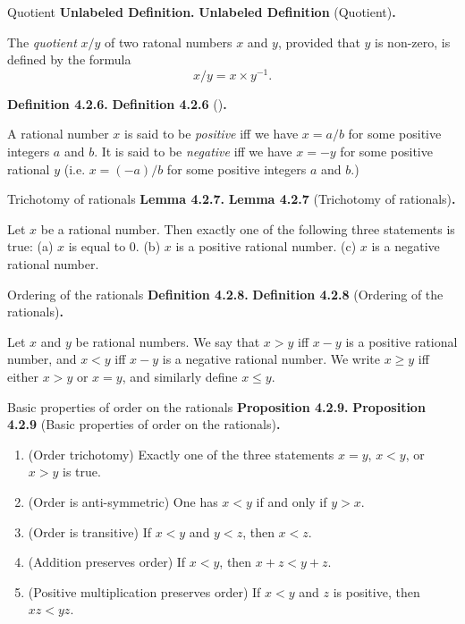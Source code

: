 \documentclass[12pt]{article}
\newenvironment{df}[2][\relax]{
\vspace{4mm}
    \noindent\setlength{\parskip}{1em}%
    \ifx#1\relax%
        \textbf{#2. }%
    \else%
        \textbf{#2} (#1)\textbf{. }%
    \fi%
    \ignorespaces%
}{}
\theoremstyle{remark}
\begin{document}
\begin{df}[Quotient]{Unlabeled Definition}
    The \emph{quotient} $x/y$ of two ratonal numbers $x$ and $y$, provided that $y$ is non-zero, is defined by the formula
    {\setlength{\belowdisplayskip}{-10pt} \setlength{\belowdisplayshortskip}{-10pt}
    \[
        x/y = x \times y^{-1}.
    \]
    }
\end{df}


\begin{df}{Definition 4.2.6}
    A rational number $x$ is said to be \emph{positive} iff we have $x = a/b$ for some positive integers $a$ and $b$.
    It is said to be \emph{negative} iff we have $x = -y$ for some positive rational $y$
    (i.e. $x = (-a)/b$ for some positive integers $a$ and $b$.)
\end{df}


\begin{df}[Trichotomy of rationals]{Lemma 4.2.7}
    Let $x$ be a rational number.
    Then exactly one of the following three statements is true:
    (a) $x$ is equal to $0$.
    (b) $x$ is a positive rational number.
    (c) $x$ is a negative rational number.
\end{df}


\begin{df}[Ordering of the rationals]{Definition 4.2.8}
    Let $x$ and $y$ be rational numbers.
    We say that $x > y$ iff $x - y$ is a positive rational number,
    and $x < y$ iff $x - y$ is a negative rational number.
    We write $x \ge y$ iff either $x > y$ or $x = y$, and similarly define $x \le y$.
\end{df}


\begin{df}[Basic properties of order on the rationals]{Proposition 4.2.9}
    \begin{enumerate}[topsep=0mm,label=(\alph*)]
        \item (Order trichotomy) Exactly one of the three statements $x = y$, $x < y$, or $x > y$ is true.
        \item (Order is anti-symmetric) One has $x < y$ if and only if $y > x$.
        \item (Order is transitive) If $x < y$ and $y < z$, then $x < z$.
        \item (Addition preserves order) If $x < y$, then $x + z < y + z$.
        \item (Positive multiplication preserves order) If $x < y$ and $z$ is positive, then $xz < yz$.
    \end{enumerate}
\end{df}
\end{document}
